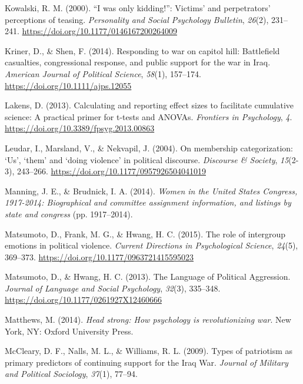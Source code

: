 \documentclass[english,,man]{apa6}
\begin{document}
\leavevmode\hypertarget{ref-Kowalski2000}{}%
Kowalski, R. M. (2000). ``I was only kidding!'': Victims' and perpetrators' perceptions of teasing. \emph{Personality and Social Psychology Bulletin}, \emph{26}(2), 231--241. \url{https://doi.org/10.1177/0146167200264009}

\leavevmode\hypertarget{ref-Kriner2014}{}%
Kriner, D., \& Shen, F. (2014). Responding to war on capitol hill: Battlefield casualties, congressional response, and public support for the war in Iraq. \emph{American Journal of Political Science}, \emph{58}(1), 157--174. \url{https://doi.org/10.1111/ajps.12055}

\leavevmode\hypertarget{ref-Lakens2013}{}%
Lakens, D. (2013). Calculating and reporting effect sizes to facilitate cumulative science: A practical primer for t-tests and ANOVAs. \emph{Frontiers in Psychology}, \emph{4}. \url{https://doi.org/10.3389/fpsyg.2013.00863}

\leavevmode\hypertarget{ref-Leudar2004}{}%
Leudar, I., Marsland, V., \& Nekvapil, J. (2004). On membership categorization: `Us', `them' and `doing violence' in political discourse. \emph{Discourse \& Society}, \emph{15}(2-3), 243--266. \url{https://doi.org/10.1177/0957926504041019}

\leavevmode\hypertarget{ref-Manning2014}{}%
Manning, J. E., \& Brudnick, I. A. (2014). \emph{Women in the United States Congress, 1917-2014: Biographical and committee assignment information, and listings by state and congress} (pp. 1917--2014).

\leavevmode\hypertarget{ref-Matsumoto2015}{}%
Matsumoto, D., Frank, M. G., \& Hwang, H. C. (2015). The role of intergroup emotions in political violence. \emph{Current Directions in Psychological Science}, \emph{24}(5), 369--373. \url{https://doi.org/10.1177/0963721415595023}

\leavevmode\hypertarget{ref-Matsumoto2013}{}%
Matsumoto, D., \& Hwang, H. C. (2013). The Language of Political Aggression. \emph{Journal of Language and Social Psychology}, \emph{32}(3), 335--348. \url{https://doi.org/10.1177/0261927X12460666}

\leavevmode\hypertarget{ref-Matthews2014}{}%
Matthews, M. (2014). \emph{Head strong: How psychology is revolutionizing war}. New York, NY: Oxford University Press.

\leavevmode\hypertarget{ref-McCleary2009}{}%
McCleary, D. F., Nalls, M. L., \& Williams, R. L. (2009). Types of patriotism as primary predictors of continuing support for the Iraq War. \emph{Journal of Military and Political Sociology}, \emph{37}(1), 77--94.
\end{document}
